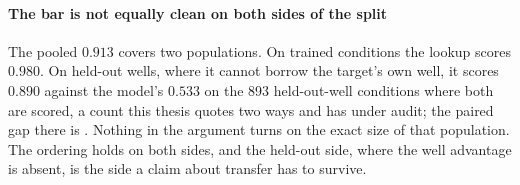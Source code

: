 \paragraph{The bar is not equally clean on both sides of the split} The pooled
$0.913$ covers two populations. On trained conditions the lookup scores $0.980$.
On held-out wells, where it cannot borrow the target's own well, it scores
$0.890$ against the model's $0.533$ on the 893 held-out-well
conditions where both are scored, a count this thesis quotes two ways and has
under audit; the paired gap there is . Nothing in the
argument turns on the exact size of that population. The ordering holds on both
sides, and the held-out side, where the well advantage is absent, is the side a
claim about transfer has to survive.

